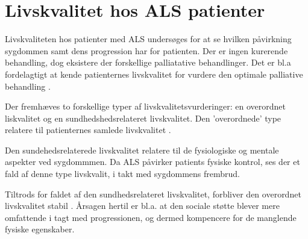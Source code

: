 \section{Livskvalitet hos ALS patienter}
Livskvaliteten hos patienter med ALS undersøges for at se hvilken påvirkning sygdommen samt dens progression har for patienten. Der er ingen kurerende behandling, dog eksistere der forskellige palliatative behandlinger. Det er bl.a fordelagtigt at kende patienternes livskvalitet for vurdere den optimale palliative behandling \citep{neudert2004}.

Der fremhæves to forskellige typer af livskvalitetsvurderinger: en overordnet liskvalitet og en sundhedshedsrelateret livskvalitet. 
Den 'overordnede' type relatere til patienternes samlede livskvalitet \citep{lse2014, nuebert2004}.   

Den sundehedsrelaterede livskvalitet relatere til de fysiologiske og mentale aspekter ved sygdommmen. Da ALS påvirker patients fysiske kontrol, ses der et fald af denne type livskvalit, i takt med sygdommens frembrud. \citep{lse2014} 


Tiltrods for faldet af den sundhedsrelateret livskvalitet, forbliver den overordnet livskvalitet stabil \citep{lse2014, nuebert2004}. Årsagen hertil er bl.a. at den sociale støtte blever mere omfattende i tagt med progressionen, og dermed kompencere for de manglende fysiske egenskaber. \citep{lse2014}   

